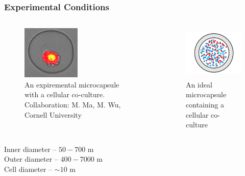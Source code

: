 \documentclass{beamer}
\begin{document}
  \begin{frame}
    \frametitle{Experimental Conditions}
  	\begin{columns}[t] 
  	\begin{figure}
  	  \includegraphics[height=1.0in]{minglin.png}
  	  \caption{An expiremental microcapsule with a cellular co-culture.
Collaboration: M. Ma, M. Wu, Cornell University}
  	\end{figure}
    \begin{figure}
      \includegraphics[height=1.0in]{Fig1.png}
      \caption{An ideal microcapsule containing a cellular co-culture}
    \end{figure}
    \end{columns}
    \begin{centering}
    Inner diameter -- $50-700$ \textmu m\\
    Outer diameter -- $400-7000$ \textmu m\\
	  Cell diameter -- $\sim 10$ \textmu m\\
    \end{centering}
    \vfill
  \end{frame}
\end{document}
